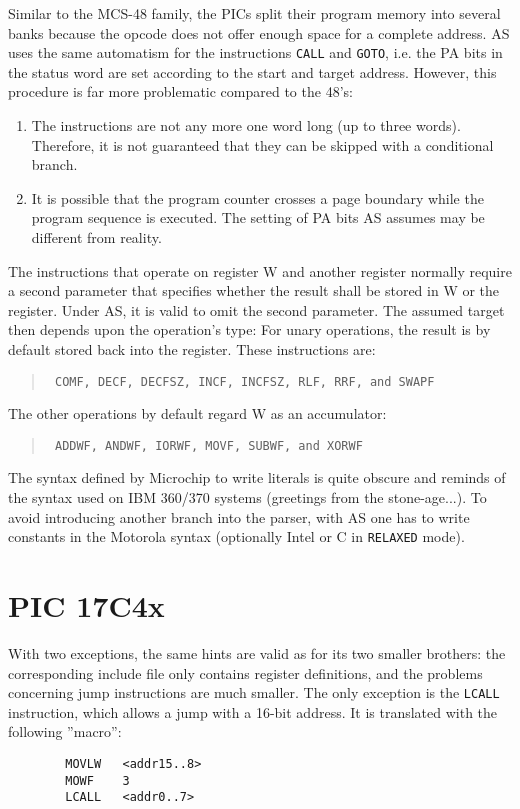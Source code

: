 \documentclass[12pt,twoside]{report}
\newcommand{\tty}[1]{{\tt #1}}
\begin{document}
Similar to the MCS-48 family, the PICs split their program memory
into several banks because the opcode does not offer enough space for
a complete address.  AS uses the same automatism for the instructions
\tty{CALL} and \tty{GOTO}, i.e. the PA bits in the status word are set according
to the start and target address.  However, this procedure is far more
problematic compared to the 48's:
\begin{enumerate}
\item{The instructions are not any more one word long (up to three
      words).  Therefore, it is not guaranteed that they can be
      skipped with a conditional branch.}
\item{It is possible that the program counter crosses a page boundary
      while the program sequence is executed.  The setting of PA bits
      AS assumes may be different from reality.}
\end{enumerate}
The instructions that operate on register W and another register
normally require a second parameter that specifies whether the result
shall be stored in W or the register.  Under AS, it is valid to omit
the second parameter.  The assumed target then depends upon the
operation's type: For unary operations, the result is by default
stored back into the register.  These instructions are:
\begin{quote}{\tt
    COMF, DECF, DECFSZ, INCF, INCFSZ, RLF, RRF, and SWAPF
}\end{quote}
The other operations by default regard W as an accumulator:
\begin{quote}{\tt
    ADDWF, ANDWF, IORWF, MOVF, SUBWF, and XORWF
}\end{quote}
The syntax defined by Microchip to write literals is quite obscure
and reminds of the syntax used on IBM 360/370 systems (greetings from
the stone-age...).  To avoid introducing another branch into the
parser, with AS one has to write constants in the Motorola syntax
(optionally Intel or C in \tty{RELAXED} mode).


\section{PIC 17C4x}

With two exceptions, the same hints are valid as for its two smaller
brothers: the corresponding include file only contains register
definitions, and the problems concerning jump instructions are much
smaller.  The only exception is the \tty{LCALL} instruction, which allows a
jump with a 16-bit address.  It is translated with the following
''macro'':
\begin{verbatim}
        MOVLW   <addr15..8>
        MOWF    3
        LCALL   <addr0..7>
\end{verbatim}
\end{document}
